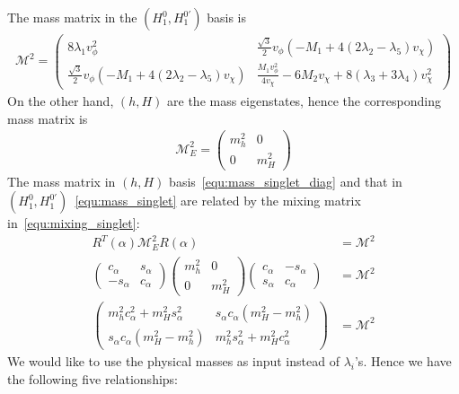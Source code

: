 \documentclass[12pt]{article}
\begin{document}
The mass matrix in the $(H_1^0, H_1^{0\prime})$ basis is
\begin{align}
\label{equ:mass_singlet}
\mathcal{M}^2 = \begin{pmatrix}
    8\lambda_1v_\phi^2 & \frac{\sqrt{3}}{2}v_\phi\left(-M_1+4(2\lambda_2 - \lambda_5)v_\chi\right)\\
    \frac{\sqrt{3}}{2}v_\phi\left(-M_1+4(2\lambda_2 - \lambda_5)v_\chi\right) & \frac{M_1v_\phi^2}{4v_\chi}-6M_2v_\chi+8(\lambda_3+3\lambda_4)v_\chi^2
\end{pmatrix}
\end{align}
On the other hand, $(h,H)$ are the mass eigenstates, hence the corresponding mass matrix is
\begin{align}
\label{equ:mass_singlet_diag}
\mathcal{M}^2_E = \begin{pmatrix}
    m_h^2 & 0 \\
    0 & m_H^2
\end{pmatrix}
\end{align}
The mass matrix in $(h,H)$ basis~\autoref{equ:mass_singlet_diag} and that in $(H_1^0,H_1^{0\prime})$~\autoref{equ:mass_singlet} are related by the mixing matrix in~\autoref{equ:mixing_singlet}:
\begin{align}
    R^T(\alpha)\mathcal{M}_E^2R(\alpha) &= \mathcal{M}^2\nonumber\\
    \begin{pmatrix}
        c_\alpha & s_\alpha \\
        -s_\alpha & c_\alpha
    \end{pmatrix}\begin{pmatrix}
        m_h^2 & 0 \\
        0 & m_H^2
    \end{pmatrix}\begin{pmatrix}
        c_\alpha & -s_\alpha \\
        s_\alpha & c_\alpha
    \end{pmatrix} &= \mathcal{M}^2\nonumber\\
    \begin{pmatrix}
        m_h^2c_\alpha^2+m_H^2s_\alpha^2 & s_\alpha c_\alpha (m_H^2-m_h^2)\\
        s_\alpha c_\alpha (m_H^2-m_h^2) & m_h^2 s_\alpha^2 + m_H^2 c_\alpha^2
    \end{pmatrix} &= \mathcal{M}^2
\end{align}
We would like to use the physical masses as input instead of $\lambda_i$'s. Hence we have the following five relationships:
\end{document}
